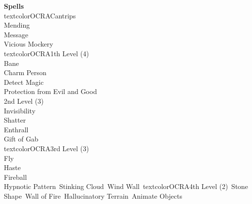 \documentclass[11pt]{article}
\begin{document}
\newpage
{}
\begin{minipage}[t]{.5\textwidth}
{\huge \textbf{\Fontauri Spells}}\\
textcolor{OCRA}{Cantrips}\\
Mending\\
Message\\
Vicious Mockery\\
textcolor{OCRA}{1th Level (4)}\\
Bane \\
Charm Person\\
Detect Magic\\
Protection from Evil and Good\\
\textcolor{OCRA}{2nd Level (3)}\\
Invisibility\\
Shatter\\
Enthrall\\
Gift of Gab\\
textcolor{OCRA}{3rd Level (3)}\\
Fly\\
Haste\\
Fireball\\
Hypnotic Pattern\
Stinking Cloud\
Wind Wall\
textcolor{OCRA}{4th Level (2)}\
Stone Shape\
Wall of Fire\
Hallucinatory Terrain\
Animate Objects
\end{minipage}
\end{document}
